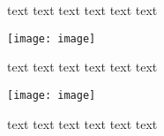 \documentclass{article}
\renewenvironment{figure}[1][]{%
    \begin{preview}%
    
        \renewcommand{\caption}[2][]{}%
        
}{%
    \end{preview}%
}
\begin{document}
text text text text text text 

\begin{figure}[t]
    \centering
    \texttt{[image: image]}%
    \caption{Some caption}
\end{figure}

text text text text text text 

\begin{figure}[b]
    \centering
    \texttt{[image: image]}%
    \caption[short]{Some caption}
\end{figure}
\newpage
text text text text text text 
\end{document}
